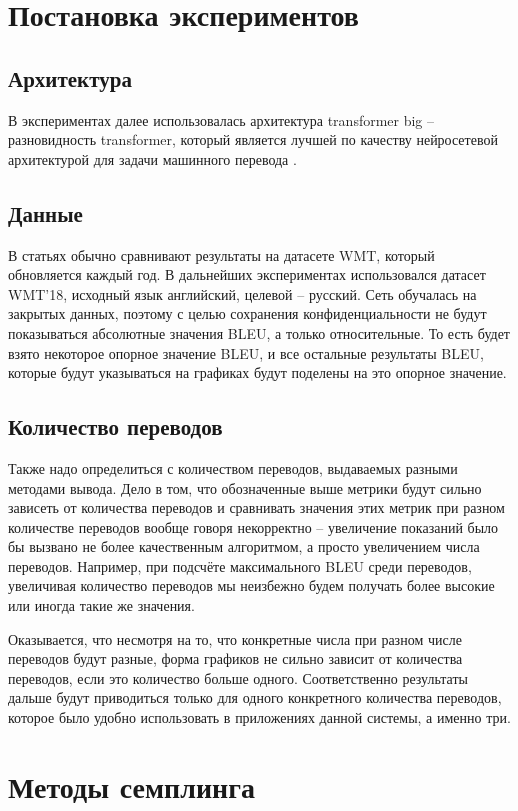 \documentclass[a4paper, 12pt]{extarticle}
\begin{document}
\section{Постановка экспериментов}
\subsection{Архитектура}
    В экспериментах далее использовалась архитектура transformer big -- разновидность transformer, который является лучшей по качеству нейросетевой архитектурой для задачи машинного перевода \cite{attention}.

\subsection{Данные}
    В статьях обычно сравнивают результаты на датасете WMT, который обновляется каждый год. В дальнейших экспериментах использовался датасет WMT'18, исходный язык английский, целевой -- русский. Сеть обучалась на закрытых данных, поэтому с целью сохранения конфиденциальности не будут показываться абсолютные значения BLEU, а только относительные. То есть будет взято некоторое опорное значение BLEU, и все остальные результаты BLEU, которые будут указываться на графиках будут поделены на это опорное значение.

\subsection{Количество переводов}
    Также надо определиться с количеством переводов, выдаваемых разными методами вывода. Дело в том, что обозначенные выше метрики будут сильно зависеть от количества переводов и сравнивать значения этих метрик при разном количестве переводов вообще говоря некорректно -- увеличение показаний было бы вызвано не более качественным алгоритмом, а просто увеличением числа переводов. Например, при подсчёте максимального BLEU среди переводов, увеличивая количество переводов мы неизбежно будем получать более высокие или иногда такие же значения.

    Оказывается, что несмотря на то, что конкретные числа при разном числе переводов будут разные, форма графиков не сильно зависит от количества переводов, если это количество больше одного. Соответственно результаты дальше будут приводиться только для одного конкретного количества переводов, которое было удобно использовать в приложениях данной системы, а именно три.

\section{Методы семплинга}
\end{document}
